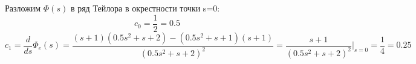 \documentclass[a4paper, 11pt]{article}
\begin{document}
Разложим $\varPhi(s)$ в ряд Тейлора в окрестности точки s=0:
\[{c_0} = \frac{1}{2} = 0.5\]
\[{c_1} = \frac{d}{{ds}}{\Phi _e}(s) = \frac{{(s + 1)(0.5{s^2} + s + 2) - (0.5{s^2} + s + 1)(s + 1)}}{{{{(0.5{s^2} + s + 2)}^2}}} = \frac{{s + 1}}{{{{(0.5{s^2} + s + 2)}^2}}}{|_{s = 0}} = \frac{1}{4} = 0.25\]
\end{document}
